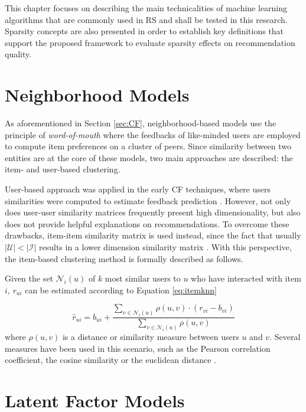 This chapter focuses on describing the main technicalities of machine learning algorithms that are commonly used in RS and shall be tested in this research. Sparsity concepts are also presented in order to establish key definitions that support the proposed framework to evaluate sparsity effects on recommendation quality.

\section{Neighborhood Models}

As aforementioned in Section \ref{sec:CF}, neighborhood-based models use the principle of \textit{word-of-mouth} where the feedbacks of like-minded users are employed to compute item preferences on a cluster of peers. Since similarity between two entities are at the core of these models, two main approaches are described: the item- and user-based clustering.

User-based approach was applied in the early CF techniques, where users similarities were computed to estimate feedback prediction \cite{1999AlgorithmicFramework}. However, not only does user-user similarity matrices frequently present high dimensionality, but also does not provide helpful explanations on recommendations. To overcome these drawbacks, item-item similarity matrix is used instead, since the fact that usually $|\mathcal{U}| < |\mathcal{I}|$ results in a lower dimension similarity matrix \cite{2001sarwar}. With this perspective, the item-based clustering method is formally described as follows.

Given the set $\mathcal{N}_i(u)$ of $k$ most similar users to $u$ who have interacted with item $i$, $r_{ui}$ can be estimated according to Equation \ref{eq:itemknn}

\begin{equation} 
    \label{eq:itemknn}
    \hat{r}_{ui} = b_{ui} + \frac{\sum_{v \in \mathcal{N}_i(u)} \rho(u,v)\cdot (r_{vi}-b_{vi})}{\sum_{v \in \mathcal{N}_i(u)} \rho(u,v)}
\end{equation} where $\rho(u,v)$ is a distance or similarity measure between users $u$ and $v$. Several  measures have been used in this scenario, such as the Pearson correlation coefficient, the cosine similarity or the euclidean distance \cite{2010Handbook, 10.1145/3133264.3133299}.


\section{Latent Factor Models}


